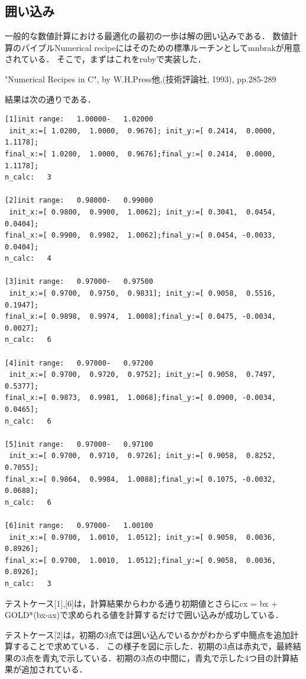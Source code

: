     \subsection{囲い込み}\label{ux56f2ux3044ux8fbcux307f}

一般的な数値計算における最適化の最初の一歩は解の囲い込みである．
数値計算のバイブルNumerical
recipeにはそのための標準ルーチンとしてmnbrakが用意されている．
そこで，まずはこれをrubyで実装した．

"Numerical Recipes in C", by W.H.Press他,(技術評論社, 1993), pp.285-289

結果は次の通りである．

\begin{verbatim}
[1]init range:   1.00000-   1.02000
 init_x:=[ 1.0200,  1.0000,  0.9676]; init_y:=[ 0.2414,  0.0000,  1.1178];
final_x:=[ 1.0200,  1.0000,  0.9676];final_y:=[ 0.2414,  0.0000,  1.1178];
n_calc:   3

[2]init range:   0.98000-   0.99000
 init_x:=[ 0.9800,  0.9900,  1.0062]; init_y:=[ 0.3041,  0.0454,  0.0404];
final_x:=[ 0.9900,  0.9982,  1.0062];final_y:=[ 0.0454, -0.0033,  0.0404];
n_calc:   4

[3]init range:   0.97000-   0.97500
 init_x:=[ 0.9700,  0.9750,  0.9831]; init_y:=[ 0.9058,  0.5516,  0.1947];
final_x:=[ 0.9898,  0.9974,  1.0008];final_y:=[ 0.0475, -0.0034,  0.0027];
n_calc:   6

[4]init range:   0.97000-   0.97200
 init_x:=[ 0.9700,  0.9720,  0.9752]; init_y:=[ 0.9058,  0.7497,  0.5377];
final_x:=[ 0.9873,  0.9981,  1.0068];final_y:=[ 0.0900, -0.0034,  0.0465];
n_calc:   6

[5]init range:   0.97000-   0.97100
 init_x:=[ 0.9700,  0.9710,  0.9726]; init_y:=[ 0.9058,  0.8252,  0.7055];
final_x:=[ 0.9864,  0.9984,  1.0088];final_y:=[ 0.1075, -0.0032,  0.0688];
n_calc:   6

[6]init range:   0.97000-   1.00100
 init_x:=[ 0.9700,  1.0010,  1.0512]; init_y:=[ 0.9058,  0.0036,  0.8926];
final_x:=[ 0.9700,  1.0010,  1.0512];final_y:=[ 0.9058,  0.0036,  0.8926];
n_calc:   3
\end{verbatim}

テストケース{[}1{]},{[}6{]}は，計算結果からわかる通り初期値とさらにcx =
bx + GOLD*(bx-ax)で求められる値を計算するだけで囲い込みが成功している．

テストケース{[}2{]}は，初期の3点では囲い込んでいるかがわからず中簡点を追加計算することで求めている．
この様子を図に示した．初期の3点は赤丸で，最終結果の3点を青丸で示している．初期の3点の中間に，青丸で示した4つ目の計算結果が追加されている．


